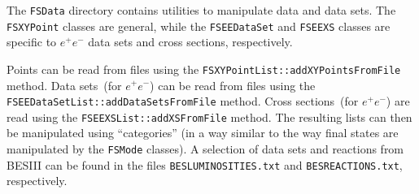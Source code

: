 \documentclass[11pt]{article}
\begin{document}
The {\tt FSData} directory contains utilities to manipulate data and data sets.  The {\tt FSXYPoint} classes are general, while the {\tt FSEEDataSet} and {\tt FSEEXS} classes are specific to $e^+e^-$ data sets and cross sections, respectively.

Points can be read from files using the {\tt FSXYPointList::addXYPointsFromFile} method.
Data sets~(for $e^+e^-$) can be read from files using the {\tt FSEEDataSetList::addDataSetsFromFile} method.  Cross sections~(for $e^+e^-$) are read using the {\tt FSEEXSList::addXSFromFile} method.  The resulting lists can then be manipulated using ``categories'' (in a way similar to the way final states are manipulated by the {\tt FSMode} classes).  A selection of data sets and reactions from BESIII can be found in the files {\tt BESLUMINOSITIES.txt} and {\tt BESREACTIONS.txt}, respectively.
\end{document}
